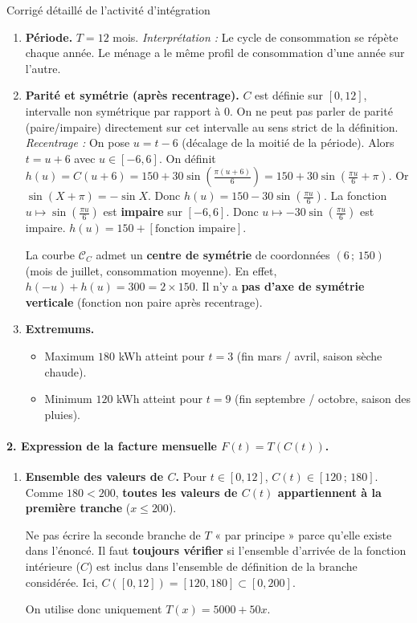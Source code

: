 \documentclass[11pt]{article}
\begin{document}
\begin{exoresolu}{Corrigé détaillé de l'activité d'intégration}
\begin{enumerate}
    \item \textbf{Période.} $T = 12$ mois. \emph{Interprétation :} Le cycle de consommation se répète chaque année. Le ménage a le même profil de consommation d'une année sur l'autre.

    \item \textbf{Parité et symétrie (après recentrage).}
    $C$ est définie sur $[0,12]$, intervalle non symétrique par rapport à 0. On ne peut pas parler de parité (paire/impaire) directement sur cet intervalle au sens strict de la définition.
    \emph{Recentrage :} On pose $u = t - 6$ (décalage de la moitié de la période). Alors $t = u+6$ avec $u \in [-6, 6]$.
    On définit $h(u) = C(u+6) = 150 + 30 \sin\left(\frac{\pi(u+6)}{6}\right) = 150 + 30 \sin\left(\frac{\pi u}{6} + \pi\right)$.
    Or $\sin(X+\pi) = -\sin X$. Donc $h(u) = 150 - 30 \sin\left(\frac{\pi u}{6}\right)$.
    La fonction $u \mapsto \sin(\frac{\pi u}{6})$ est \textbf{impaire} sur $[-6,6]$.
    Donc $u \mapsto -30 \sin(\frac{\pi u}{6})$ est impaire.
    $h(u) = 150 + [\text{fonction impaire}]$.
    \begin{aretenir}
    La courbe $\mathcal{C}_C$ admet un \textbf{centre de symétrie} de coordonnées $(6\,;\, 150)$ (mois de juillet, consommation moyenne).
    En effet, $h(-u) + h(u) = 300 = 2 \times 150$.
    Il n'y a \textbf{pas d'axe de symétrie verticale} (fonction non paire après recentrage).
    \end{aretenir}

    \item \textbf{Extremums.}
    \begin{itemize}
        \item Maximum $180$ kWh atteint pour $t=3$ (fin mars / avril, saison sèche chaude).
        \item Minimum $120$ kWh atteint pour $t=9$ (fin septembre / octobre, saison des pluies).
    \end{itemize}
\end{enumerate}

\paragraph{2. Expression de la facture mensuelle $F(t) = T(C(t))$.}
\begin{enumerate}
    \item \textbf{Ensemble des valeurs de $C$.}
    Pour $t \in [0,12]$, $C(t) \in [120\,;\, 180]$.
    Comme $180 < 200$, \textbf{toutes les valeurs de $C(t)$ appartiennent à la première tranche} ($x \le 200$).
    \begin{attention}
    Ne pas écrire la seconde branche de $T$ « par principe » parce qu'elle existe dans l'énoncé. Il faut \textbf{toujours vérifier} si l'ensemble d'arrivée de la fonction intérieure ($C$) est inclus dans l'ensemble de définition de la branche considérée. Ici, $C([0,12]) = [120,180] \subset [0,200]$.
    \end{attention}
    On utilise donc uniquement $T(x) = 5000 + 50x$.


\end{enumerate}
\end{exoresolu}
\end{document}
